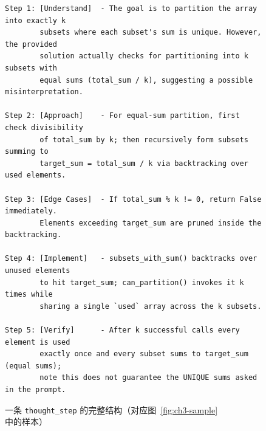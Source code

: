 \begin{figure}[!htb]
\begin{footnotesize}
\begin{verbatim}
Step 1: [Understand]  - The goal is to partition the array into exactly k
        subsets where each subset's sum is unique. However, the provided
        solution actually checks for partitioning into k subsets with
        equal sums (total_sum / k), suggesting a possible misinterpretation.

Step 2: [Approach]    - For equal-sum partition, first check divisibility
        of total_sum by k; then recursively form subsets summing to
        target_sum = total_sum / k via backtracking over used elements.

Step 3: [Edge Cases]  - If total_sum % k != 0, return False immediately.
        Elements exceeding target_sum are pruned inside the backtracking.

Step 4: [Implement]   - subsets_with_sum() backtracks over unused elements
        to hit target_sum; can_partition() invokes it k times while
        sharing a single `used` array across the k subsets.

Step 5: [Verify]      - After k successful calls every element is used
        exactly once and every subset sums to target_sum (equal sums);
        note this does not guarantee the UNIQUE sums asked in the prompt.
\end{verbatim}
\end{footnotesize}
\vspace{-2mm}
\caption{一条 \texttt{thought\_step} 的完整结构（对应图~\ref{fig:ch3-sample} 中的样本）}
\label{fig:ch3-thought-example}
\end{figure}